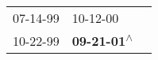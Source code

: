 \begin{supertabular}{lll}
 07-14-99\textsuperscript{} &                   10-12-00\textsuperscript{} \\
 10-22-99\textsuperscript{} &  \textbf{09-21-01\textsuperscript{$\wedge$}} \\
\end{supertabular}
